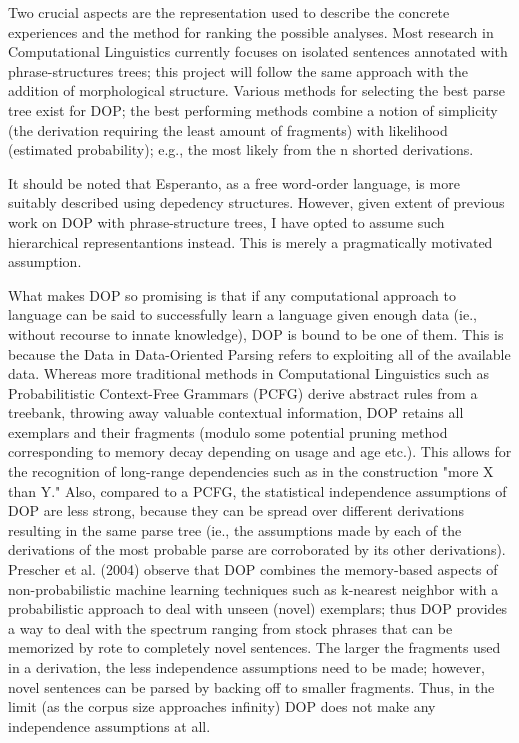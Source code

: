 \documentclass[10pt,a4paper]{article}
\begin{document}
Two crucial aspects are the representation used to describe the concrete
experiences and the method for ranking the possible analyses. Most research in
Computational Linguistics currently focuses on isolated sentences annotated
with phrase-structures trees; this project will follow the same approach with
the addition of morphological structure. Various methods for selecting the best
parse tree exist for DOP; the best performing methods combine a notion of
simplicity (the derivation requiring the least amount of fragments) with
likelihood (estimated probability); e.g., the most likely from the n shorted
derivations.

It should be noted that Esperanto, as a free word-order language, is more
suitably described using depedency structures. However, given extent of
previous work on DOP with phrase-structure trees, I have opted to assume such
hierarchical representantions instead. This is merely a pragmatically motivated
assumption. 

What makes DOP so promising is that if any computational approach to language
can be said to successfully learn a language given enough data (ie., without
recourse to innate knowledge), DOP is bound to be one of them.  This is because
the Data in Data-Oriented Parsing refers to exploiting all of the available
data. Whereas more traditional methods in Computational Linguistics such as
Probabilitistic Context-Free Grammars (PCFG) derive abstract rules from a
treebank, throwing away valuable contextual information, DOP retains all
exemplars and their fragments (modulo some potential pruning method
corresponding to memory decay depending on usage and age etc.). This allows for
the recognition of long-range dependencies such as in the construction "more X
than Y." Also, compared to a PCFG, the statistical independence assumptions of
DOP are less strong, because they can be spread over different derivations
resulting in the same parse tree (ie., the assumptions made by each of the
derivations of the most probable parse are corroborated by its other
derivations). Prescher et al. (2004) observe that DOP combines the memory-based
aspects of non-probabilistic machine learning techniques such as k-nearest
neighbor with a probabilistic approach to deal with unseen (novel) exemplars;
thus DOP provides a way to deal with the spectrum ranging from stock phrases
that can be memorized by rote to completely novel sentences. The larger the
fragments used in a derivation, the less independence assumptions need to be
made; however, novel sentences can be parsed by backing off to smaller
fragments. Thus, in the limit (as the corpus size approaches infinity) DOP does
not make any independence assumptions at all. 
\end{document}
